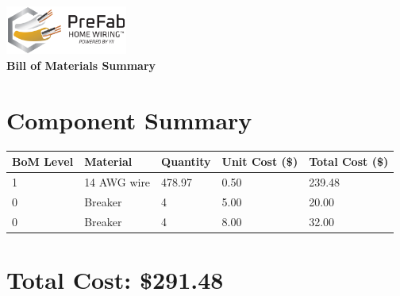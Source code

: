 \documentclass{article}
\begin{document}
\begin{center}
\includegraphics[width=0.3\textwidth]{logo.png}\\[1em]
{\LARGE \textbf{Bill of Materials Summary}}\\[0.5em]
\end{center}
\vspace{1.5em}
\section*{Component Summary}
\begin{tabular}{lllll}
\toprule
\textbf{BoM Level} & \textbf{Material} & \textbf{Quantity} & \textbf{Unit Cost (\$)} & \textbf{Total Cost (\$)} \\
\midrule
1 & 14 AWG wire & 478.97 & 0.50 & 239.48 \\
0 & Breaker & 4 & 5.00 & 20.00 \\
0 & Breaker & 4 & 8.00 & 32.00 \\
\bottomrule
\end{tabular}

\section*{Total Cost: \$291.48}
\end{document}
